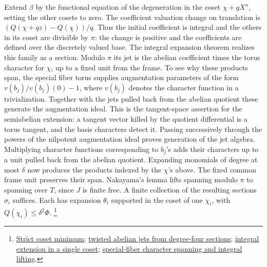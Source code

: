 Extend \(\beta\) by the functional equation of the degeneration in
the coset \(\chi+qX^n\), setting the other cosets to zero.
The coefficient valuation change on translation is
\((Q(\chi+qz)-Q(\chi))/q\). Thus the initial coefficient is
integral and the others in its coset are divisible by \(\pi\):
the change is positive and the coefficients are defined over the
discretely valued base. The integral expansion theorem realizes
this family as a section. Modulo \(\pi\) its jet is the abelian
coefficient times the torus character for \(\chi\), up to a fixed
unit from the frame. To see why these products span, the special
fiber torus supplies augmentation parameters of the form
\(v(b_j)/v(b_j)(0)-1\), where \(v(b_j)\) denotes the character
function in a trivialization. Together with the jets pulled back
from the abelian quotient these generate the augmentation ideal.
This is the tangent-space assertion for the semiabelian extension:
a tangent vector killed by the quotient differential is a torus
tangent, and the basis characters detect it. Passing successively
through the powers of the nilpotent augmentation ideal proves
generation of the jet algebra. Multiplying character functions
corresponding to \(b_j\)'s adds their characters up to a unit
pulled back from the abelian quotient. Expanding monomials of
degree at most \(\delta\) now produces the products indexed by the
\(\chi\)'s above. The fixed common frame unit preserves their span.
Nakayama's lemma lifts spanning modulo \(\pi\) to spanning over \(T\),
since \(J\) is finite free. A finite collection of the resulting
sections \(\sigma_i\) suffices. Each has expansion \(\theta_i\)
supported in the coset of one \(\chi_i\), with
\(Q(\chi_i)\le\delta^2\Phi\).
\footnote{\href{https://github.com/ChristianKudeba/alpoge-rh-verification/blob/alpoge-source-7cbf7a0c/src/Development/AbelianVarietyTheory/Proofs/JetHarmonics/SmallCombinationStrictMinMod.lean}{Strict coset minimum};
\href{https://github.com/ChristianKudeba/alpoge-rh-verification/blob/alpoge-source-7cbf7a0c/src/Development/AbelianVarietyTheory/Proofs/JetHarmonics/MemBasicOpenOfIsUnit.lean}{twisted abelian jets from degree-four sections};
\href{https://github.com/ChristianKudeba/alpoge-rh-verification/blob/alpoge-source-7cbf7a0c/src/Development/AbelianVarietyTheory/Proofs/JetHarmonics/IntegralFamilyOfStrictMin.lean}{integral extension in a single coset};
\href{https://github.com/ChristianKudeba/alpoge-rh-verification/blob/alpoge-source-7cbf7a0c/src/Development/AbelianVarietyTheory/Proofs/JetHarmonics/SmallCharactersSpanJets.lean}{special-fiber character spanning and integral lifting}.}

